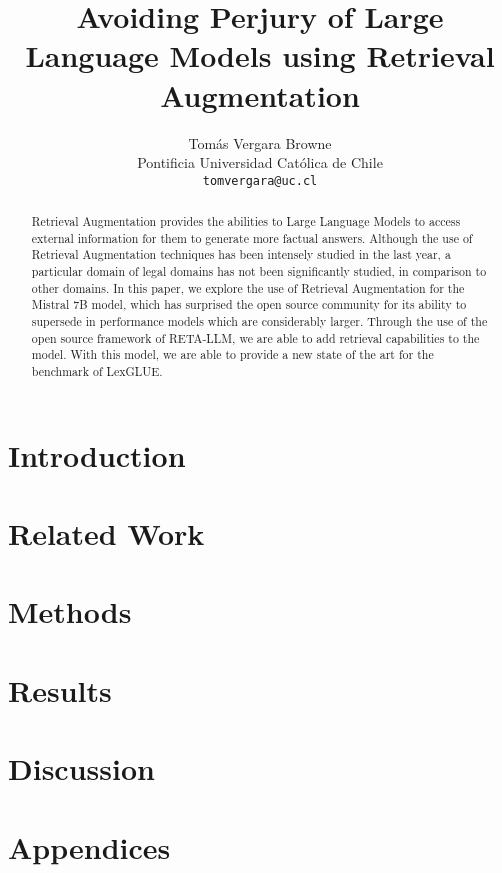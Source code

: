 \documentclass[11pt]{article}
\title{Avoiding Perjury of Large Language Models using Retrieval Augmentation}
\author{Tomás Vergara Browne \\
  Pontificia Universidad Católica de Chile \\
  \texttt{tomvergara@uc.cl} \\}
\begin{document}
\maketitle
\begin{abstract}
  Retrieval Augmentation provides the abilities to Large Language Models to access external information for them to generate more factual answers. Although the use of Retrieval Augmentation techniques has been intensely studied in the last year, a particular domain of legal domains has not been significantly studied, in comparison to other domains. In this paper, we explore the use of Retrieval Augmentation for the Mistral 7B model, which has surprised the open source community for its ability to supersede in performance models which are considerably larger. Through the use of the open source framework of RETA-LLM, we are able to add retrieval capabilities to the model. With this model, we are able to provide a new state of the art for the benchmark of LexGLUE.
\end{abstract}

\section{Introduction}


\section{Related Work}


\section{Methods}


\section{Results}

\section{Discussion}


\section{Appendices}




\appendix
\end{document}
